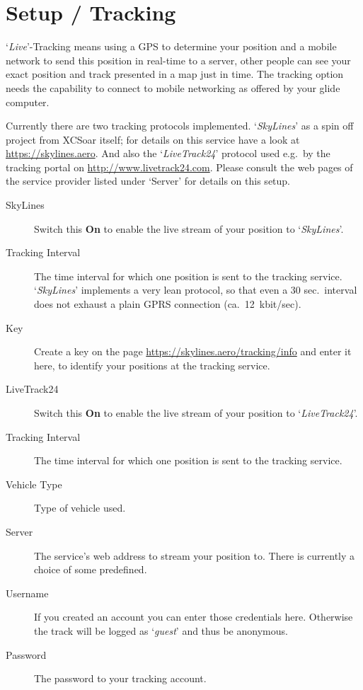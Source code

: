 \section{Setup / Tracking}

`{\it Live}'-Tracking means using a GPS to determine your position and a mobile 
network to send this position in real-time to a server, other people can see 
your exact position and track presented in a map just in time.
The tracking option needs the capability to connect to mobile networking as offered by 
your glide computer.

Currently there are two tracking protocols implemented. `{\em SkyLines}' as a spin 
off project from XCSoar itself; for details on this service have a look at 
\url{https://skylines.aero}. 
And also the `{\em LiveTrack24}' protocol used e.g.\ by the tracking
portal on \url{http://www.livetrack24.com}.  
Please consult the web pages of the service provider listed under `Server' 
for details on this setup.

\begin{description}
\item[SkyLines]  Switch this {\bf On} to enable the live stream of 
  your position to `{\em SkyLines}'.
\item[Tracking Interval]  The time interval for which one position is sent to
  the tracking service. `{\em SkyLines}' implements a very lean protocol, so that even
  a 30 sec.\ interval does not exhaust a plain GPRS connection (ca.\ 12~kbit/sec).
\item[Key]  Create a key on the page \url{https://skylines.aero/tracking/info} 
  and enter it here, to identify your positions at the tracking service.
\\
\item[LiveTrack24]  Switch this {\bf On} to enable the live stream of 
  your position to `{\em LiveTrack24}'.
\item[Tracking Interval]  The time interval for which one position is sent to
  the tracking service.
\item[Vehicle Type]  Type of vehicle used.
\item[Server]  The service's web address to stream your position to. There is currently 
  a choice of some predefined.
\item[Username]  If you created an account you can enter those credentials here. 
  Otherwise the track will be logged as `{\it guest}' and thus be anonymous.  
\item[Password]  The password to your tracking account.
\end{description}


